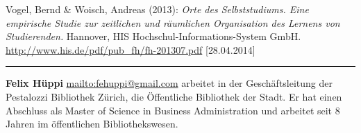 \documentclass[a4paper,
fontsize=11pt,
oneside,
numbers=noperiodatend,
parskip=half-,
bibliography=totoc,
final
]{scrartcl}
\begin{document}
Vogel, Bernd \& Woisch, Andreas (2013): \emph{Orte des Selbststudiums.
Eine empirische Studie zur zeitlichen und räumlichen Organisation des
Lernens von Studierenden.} Hannover, HIS Hochschul-Infor\-mations-System
GmbH. \url{http://www.his.de/pdf/pub_fh/fh-201307.pdf} {[}28.04.2014{]}

\begin{center}\rule{0.5\linewidth}{\linethickness}\end{center}

\textbf{Felix Hüppi} \url{mailto:fehuppi@gmail.com} arbeitet in der
Geschäftsleitung der Pestalozzi Bibliothek Zürich, die Öffentliche
Bibliothek der Stadt. Er hat einen Abschluss als Master of Science in
Business Administration und arbeitet seit 8 Jahren im öffentlichen
Bibliothekswesen.
\end{document}
